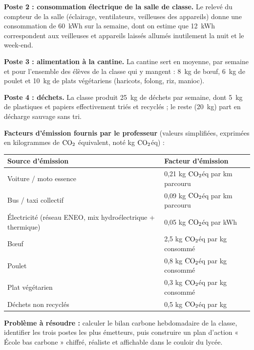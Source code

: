 \documentclass[11pt]{article}
\newcounter{popsec}
\newcounter{popsub}
\newcommand{\courssub}[1]{%
  \stepcounter{popsub}%
  \par\vspace{9pt}\noindent{\popxbold\fontsize{11.5}{13}\selectfont\color{popink}{\color{poporange}\thepopsec.\thepopsub}\hspace{6pt}#1}\par\nopagebreak\vspace{4pt}
}
\begin{document}
\textbf{Poste 2 : consommation électrique de la salle de classe.}
Le relevé du compteur de la salle (éclairage, ventilateurs, veilleuses des appareils) donne une consommation de \SI{60}{kWh} sur la semaine, dont on estime que \SI{12}{kWh} correspondent aux veilleuses et appareils laissés allumés inutilement la nuit et le week-end.

\textbf{Poste 3 : alimentation à la cantine.}
La cantine sert en moyenne, par semaine et pour l'ensemble des élèves de la classe qui y mangent : \SI{8}{kg} de bœuf, \SI{6}{kg} de poulet et \SI{10}{kg} de plats végétariens (haricots, folong, riz, manioc).

\textbf{Poste 4 : déchets.}
La classe produit \SI{25}{kg} de déchets par semaine, dont \SI{5}{kg} de plastiques et papiers effectivement triés et recyclés ; le reste (\SI{20}{kg}) part en décharge sauvage sans tri.

\textbf{Facteurs d'émission fournis par le professeur} (valeurs simplifiées, exprimées en kilogrammes de $\ce{CO2}$ équivalent, noté kg $\ce{CO2}$éq) :

\begin{center}
\begin{tabularx}{\linewidth}{|l|X|}\hline
\rowcolor{popblueL} \textbf{Source d'émission} & \textbf{Facteur d'émission} \\ \hline
Voiture / moto essence & 0,21 kg $\ce{CO2}$éq par km parcouru \\ \hline
Bus / taxi collectif & 0,09 kg $\ce{CO2}$éq par km parcouru \\ \hline
Électricité (réseau ENEO, mix hydroélectrique + thermique) & 0,05 kg $\ce{CO2}$éq par kWh \\ \hline
Bœuf & 2,5 kg $\ce{CO2}$éq par kg consommé \\ \hline
Poulet & 0,8 kg $\ce{CO2}$éq par kg consommé \\ \hline
Plat végétarien & 0,3 kg $\ce{CO2}$éq par kg consommé \\ \hline
Déchets non recyclés & 0,5 kg $\ce{CO2}$éq par kg \\ \hline
\end{tabularx}
\end{center}

\textbf{Problème à résoudre :} calculer le bilan carbone hebdomadaire de la classe, identifier les trois postes les plus émetteurs, puis construire un plan d'action « École bas carbone » chiffré, réaliste et affichable dans le couloir du lycée.

\courssub{Consignes}
\end{document}
